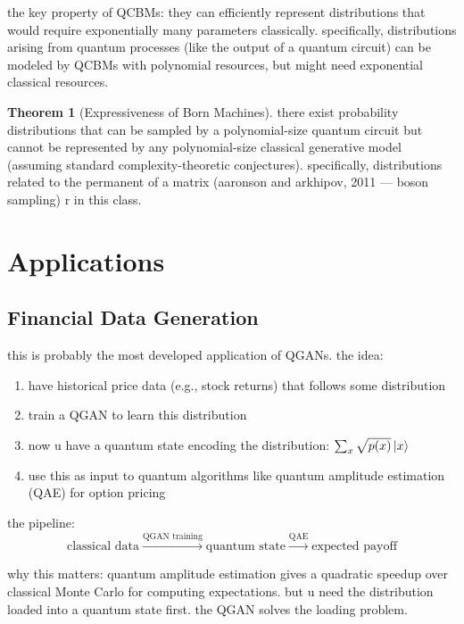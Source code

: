 \documentclass[11pt,a4paper]{article}
\theoremstyle{definition}
\newtheorem{theorem}{Theorem}[section]
\theoremstyle{remark}
\begin{document}
the key property of QCBMs: they can efficiently represent distributions that would require exponentially many parameters classically. specifically, distributions arising from quantum processes (like the output of a quantum circuit) can be modeled by QCBMs with polynomial resources, but might need exponential classical resources.

\begin{theorem}[Expressiveness of Born Machines]
there exist probability distributions that can be sampled by a polynomial-size quantum circuit but cannot be represented by any polynomial-size classical generative model (assuming standard complexity-theoretic conjectures). specifically, distributions related to the permanent of a matrix (aaronson and arkhipov, 2011 --- boson sampling) r in this class.
\end{theorem}

\section{Applications}

\subsection{Financial Data Generation}

this is probably the most developed application of QGANs. the idea:

\begin{enumerate}[label=\arabic*.]
    \item have historical price data (e.g., stock returns) that follows some distribution
    \item train a QGAN to learn this distribution
    \item now u have a quantum state encoding the distribution: $\sum_x \sqrt{p(x)} \ket{x}$
    \item use this as input to quantum algorithms like quantum amplitude estimation (QAE) for option pricing
\end{enumerate}

the pipeline:
\[
\text{classical data} \xrightarrow{\text{QGAN training}} \text{quantum state} \xrightarrow{\text{QAE}} \text{expected payoff}
\]

why this matters: quantum amplitude estimation gives a quadratic speedup over classical Monte Carlo for computing expectations. but u need the distribution loaded into a quantum state first. the QGAN solves the loading problem.
\end{document}
